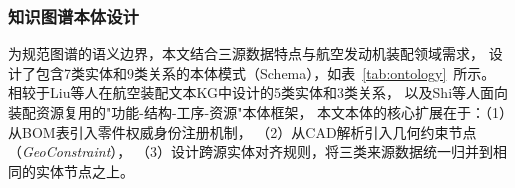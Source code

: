 \subsubsection{知识图谱本体设计}
\label{sec:ontology}

为规范图谱的语义边界，本文结合三源数据特点与航空发动机装配领域需求，
设计了包含7类实体和9类关系的本体模式（Schema），如表~\ref{tab:ontology}~所示。
相较于Liu等人\cite{liu2023avkg}在航空装配文本KG中设计的5类实体和3类关系，
以及Shi等人\cite{shi2022arkg}面向装配资源复用的"功能-结构-工序-资源"本体框架，
本文本体的核心扩展在于：（1）从BOM表引入零件权威身份注册机制，
（2）从CAD解析引入几何约束节点（\textit{GeoConstraint}），
（3）设计跨源实体对齐规则，将三类来源数据统一归并到相同的实体节点之上。

